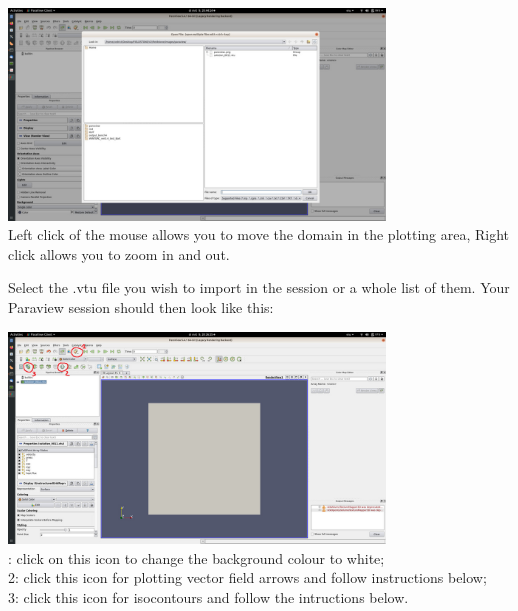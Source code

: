 \begin{center}
\includegraphics[width=10cm]{images/paraview/p2}\\
{\captionfont Left click of the mouse allows you to move the domain in the plotting area, 
Right click allows you to zoom in and out.}
\end{center}

Select the .vtu file you wish to import in the session or a whole list of them. 
Your Paraview session should then look like this:
 
\begin{center}
\includegraphics[width=10cm]{images/paraview/p3}\\
{: click on this icon to change the background colour to white;\\
2: click this icon for plotting vector field arrows and follow instructions below;\\
3: click this icon for isocontours and follow the intructions below.\\}
\end{center}


